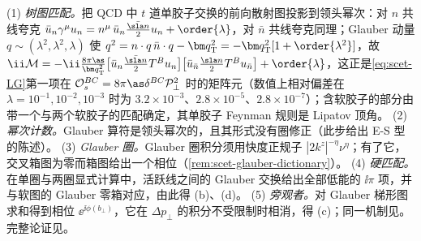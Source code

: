 \begin{proofsketch}
(1) \emph{树图匹配。}把 QCD 中 $t$ 道单胶子交换的前向散射图投影到领头幂次：对 $n$ 共线夸克 $\bar u_n\gamma^\mu u_n=n^\mu\,\bar u_n\frac{\bar{\sla n}}{2}u_n+\order{\lambda}$，对 $\bar n$ 共线夸克同理；Glauber 动量 $q\sim(\lambda^2,\lambda^2,\lambda)$ 使 $q^2=n\cdot q\,\bar n\cdot q-\bm q_{\mathrm T}^2=-\bm q_{\mathrm T}^2[1+\order{\lambda^2}]$，故
$\ii\mathcal M=-\ii\frac{8\pi\as}{\bm q_{\mathrm T}^2}\big[\bar u_n\tfrac{\bar{\sla n}}{2}T^Bu_n\big]\big[\bar u_{\bar n}\tfrac{\sla n}{2}T^Bu_{\bar n}\big]+\order{\lambda}$，这正是\cref{eq:scet-LG}第一项在 $\mathcal O_s^{BC}=8\pi\as\delta^{BC}\mathcal P_\perp^2$ 时的矩阵元（数值上相对偏差在 $\lambda=10^{-1},10^{-2},10^{-3}$ 时为 $3.2\times10^{-3}$、$2.8\times10^{-5}$、$2.8\times10^{-7}$）；含软胶子的部分由带一个与两个软胶子的匹配确定，其单胶子 Feynman 规则是 Lipatov 顶角\cite[第~5.1、6~节]{RothsteinStewart2016}。%
(2) \emph{幂次计数。}Glauber 算符是领头幂次的，且其形式没有圈修正\cite[第~5.3~节]{RothsteinStewart2016}（此步给出 E-S 型的陈述）。
(3) \emph{Glauber 圈。}Glauber 圈积分须用快度正规子 $|2k^z|^{-\eta}\nu^\eta$；有了它，交叉箱图为零而箱图给出一个相位（\cref{rem:scet-glauber-dictionary}）\cite[第~5.2~节]{RothsteinStewart2016}。
(4) \emph{硬匹配。}在单圈与两圈显式计算中，活跃线之间的 Glauber 交换给出全部低能的 $\ii\pi$ 项，并与软图的 Glauber 零箱对应，由此得 (b)、(d)\cite[第~10~节]{RothsteinStewart2016}。
(5) \emph{旁观者。}对 Glauber 梯形图求和得到相位 $\ee^{\ii\phi(b_\perp)}$，它在 $\Delta p_\perp$ 的积分不受限制时相消，得 (c)\cite[式~(9.1)、(9.18)--(9.19)、(11.12)--(11.13)]{RothsteinStewart2016}；同一机制见\cite[式~(14)]{AybatSterman2009}。完整论证见\cite[第~5、9--11~节]{RothsteinStewart2016}。
\end{proofsketch}

